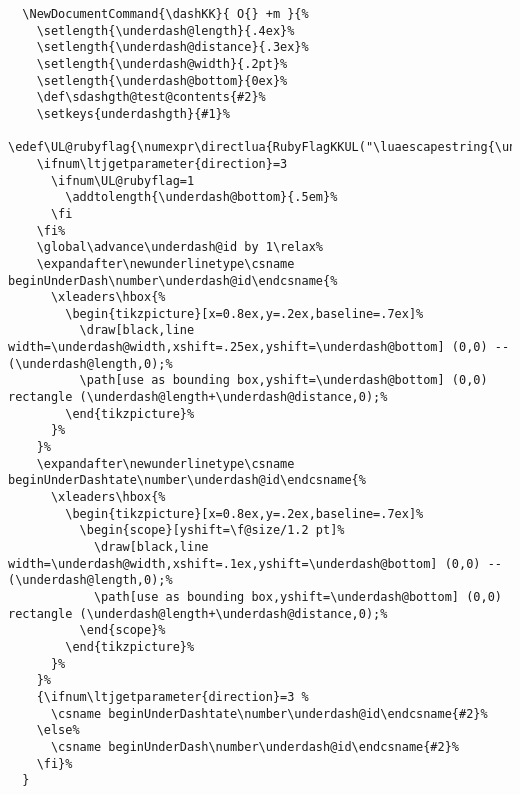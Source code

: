 \documentclass[luatex,fontsize=8pt,paper=b5,twoside]{jlreq}%
\begin{document}
\begin{lstlisting}
  \NewDocumentCommand{\dashKK}{ O{} +m }{%
    \setlength{\underdash@length}{.4ex}%
    \setlength{\underdash@distance}{.3ex}%
    \setlength{\underdash@width}{.2pt}%
    \setlength{\underdash@bottom}{0ex}%
    \def\sdashgth@test@contents{#2}%
    \setkeys{underdashgth}{#1}%
    \edef\UL@rubyflag{\numexpr\directlua{RubyFlagKKUL("\luaescapestring{\unexpanded\expandafter{\sdashgth@test@contents}}")}\relax}%
    \ifnum\ltjgetparameter{direction}=3
      \ifnum\UL@rubyflag=1
        \addtolength{\underdash@bottom}{.5em}%
      \fi
    \fi%
    \global\advance\underdash@id by 1\relax%
    \expandafter\newunderlinetype\csname beginUnderDash\number\underdash@id\endcsname{%
      \xleaders\hbox{%
        \begin{tikzpicture}[x=0.8ex,y=.2ex,baseline=.7ex]%
          \draw[black,line width=\underdash@width,xshift=.25ex,yshift=\underdash@bottom] (0,0) -- (\underdash@length,0);%
          \path[use as bounding box,yshift=\underdash@bottom] (0,0) rectangle (\underdash@length+\underdash@distance,0);%
        \end{tikzpicture}%
      }%
    }%
    \expandafter\newunderlinetype\csname beginUnderDashtate\number\underdash@id\endcsname{%
      \xleaders\hbox{%
        \begin{tikzpicture}[x=0.8ex,y=.2ex,baseline=.7ex]%
          \begin{scope}[yshift=\f@size/1.2 pt]%
            \draw[black,line width=\underdash@width,xshift=.1ex,yshift=\underdash@bottom] (0,0) -- (\underdash@length,0);%
            \path[use as bounding box,yshift=\underdash@bottom] (0,0) rectangle (\underdash@length+\underdash@distance,0);%
          \end{scope}%
        \end{tikzpicture}%
      }%
    }%
    {\ifnum\ltjgetparameter{direction}=3 %
      \csname beginUnderDashtate\number\underdash@id\endcsname{#2}%
    \else%
      \csname beginUnderDash\number\underdash@id\endcsname{#2}%
    \fi}%
  }


\end{lstlisting}
\end{document}
